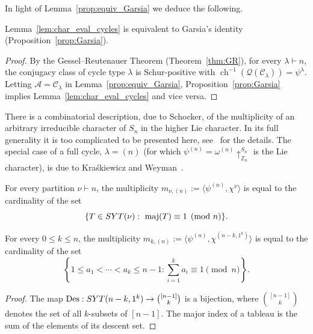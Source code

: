 \documentclass[ALCO,published]{cedram}
\newcommand{\Q}{\mathcal Q}
\newcommand{\C}{\mathcal C}
\newcommand{\A}{\mathcal A}
\DeclareMathOperator\Des{Des}
\DeclareMathOperator\maj{maj}
\def\ZZ{{\mathbb Z}}
\newcommand{\ch}{{\operatorname{ch}}}
\def\SYT{{\rm SYT}}
\begin{document}
In light of Lemma~\ref{prop:equiv_Garsia} we deduce the following. 

\begin{corollary}
    Lemma~\ref{lem:char_eval_cycles} is equivalent to Garsia's identity (Proposition~\ref{prop:Garsia}).
\end{corollary}

\begin{proof}
    By the Gessel--Reutenauer Theorem (Theorem~\ref{thm:GR}), for every $\lambda \vdash n$, 
    the conjugacy class of cycle type $\lambda$ is Schur-positive with $\ch^{-1}(\Q(\C_\lambda))=\psi^\lambda$. 
    Letting $\A = \C_\lambda$ in Lemma~\ref{prop:equiv_Garsia}, 
    Proposition~\ref{prop:Garsia} implies Lemma~\ref{lem:char_eval_cycles} and vice versa.
\end{proof}

There is a combinatorial description, due to Schocker,
of the multiplicity of an arbitrary irreducible character of $S_n$ in the higher Lie character. 
In its full generality it is too complicated to be presented here, see~\cite{schocker} for the details. 
The special case of a full cycle, $\lambda=(n)$ (for which
$\psi^{(n)} = \omega^{(n)}\uparrow_{\ZZ_n}^{S_n}$ is the Lie character), is due 
to Kra\'skiewicz and Weyman~\cite{KraskiewiczWeyman}. 
	
\begin{theorem}\label{thm:KW}
    For every partition \mbox{$\nu\vdash n$}, the multiplicity $m_{\nu,(n)} := \langle \psi^{(n)},\chi^{\nu} \rangle$ is equal to the cardinality of the set
    \[
        \{T \in \SYT(\nu):\ \maj(T) \equiv 1 \pmod n\}.
    \]	
\end{theorem}
	
\begin{corollary}\label{lem:Kra-Wey}
    For every $0\leq k\leq n$, the multiplicity 
    $m_{k,(n)} := \langle \psi^{(n)},\chi^{(n-k,1^k)} \rangle$ 
    is equal to the cardinality of the set
    \[
        \left\{ 1 \le a_1 < \cdots < a_k \le n-1 : \sum_{i=1}^k a_i \equiv 1 \!\!\!\!\pmod{n} \right\}.
    \]
\end{corollary}
	
\begin{proof}
    The map $\Des: \SYT(n-k,1^k) \rightarrow \binom{[n-1]}{k}$ is a bijection, where $\binom{[n-1]}{k}$ denotes the set of all $k$-subsets of $[n-1]$.
    The major index of a tableau is the sum of the elements of its descent set.
\end{proof}
	
\end{document}
